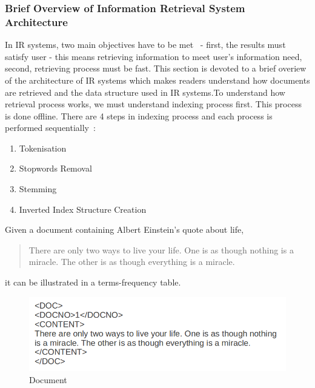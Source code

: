 \subsubsection{Brief Overview of Information Retrieval System Architecture}\label{section:IRarchitecture}
In IR systems, two main objectives have to be met~\cite{IRarchitecture} - first, the results must satisfy user - this means retrieving information to meet user's
information need, second, retrieving process must be fast. This section is devoted to a brief overiew of the architecture of IR systems which makes readers
understand how documents are retrieved and the data structure used in IR systems.To understand how retrieval process works, we must understand 
indexing process first. This process is done offline. There are 4 steps in indexing process and each process is performed sequentially~\cite{IRarchitecture}:
\begin{enumerate}
 \item Tokenisation
 \item Stopwords Removal
 \item Stemming
 \item Inverted Index Structure Creation
\end{enumerate}
Given a document containing Albert Einstein's quote about life,

\begin{quotation}
 \item There are only two ways to live your life. One is as though nothing is a miracle. The other is as though everything is a miracle.
\end{quotation}

it can be illustrated in a terms-frequency table.
\begin{figure}
\centering
\includegraphics[scale=0.5]{./figures/text.png}
\caption{Document} \label{fig:quote} 
\end{figure}

